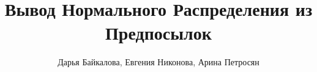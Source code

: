 
\title{\huge Вывод Нормального Распределения из Предпосылок}
\author{Дарья Байкалова, Евгения Никонова, Арина Петросян}

\newcommand{\leftfoot}{}
\newcommand{\rightfoot}{}